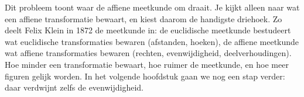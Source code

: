 Dit probleem toont waar de affiene meetkunde om draait. Je kijkt alleen naar wat een affiene transformatie bewaart, en kiest daarom de handigste driehoek. Zo deelt Felix Klein in 1872 de meetkunde in: de euclidische meetkunde bestudeert wat euclidische transformaties bewaren (afstanden, hoeken), de affiene meetkunde wat affiene transformaties bewaren (rechten, evenwijdigheid, deelverhoudingen). Hoe minder een transformatie bewaart, hoe ruimer de meetkunde, en hoe meer figuren gelijk worden. In het volgende hoofdstuk gaan we nog een stap verder: daar verdwijnt zelfs de evenwijdigheid.

\begin{oefeningen}
\end{oefeningen}

\opdrachtenkop

\begin{oefeningen}





















\end{oefeningen}



